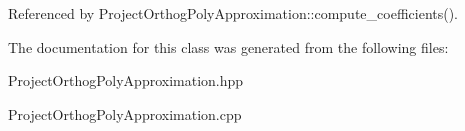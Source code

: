 Referenced by Project\+Orthog\+Poly\+Approximation\+::compute\+\_\+coefficients().



The documentation for this class was generated from the following files\+:\begin{DoxyCompactItemize}
\item 
Project\+Orthog\+Poly\+Approximation.\+hpp\item 
Project\+Orthog\+Poly\+Approximation.\+cpp\end{DoxyCompactItemize}
